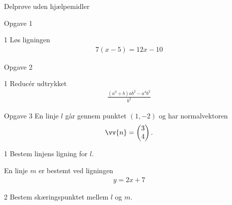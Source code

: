 \begin{center}
\LARGE
Delprøve uden hjælpemidler 
\end{center}
\begin{opgavetekst}{Opgave 1}
\end{opgavetekst}
	\begin{delopgave}{}{1}
		Løs ligningen 
		\begin{align*}
			7(x-5) = 12x-10
		\end{align*}
	\end{delopgave}
\begin{opgavetekst}{Opgave 2}
\end{opgavetekst}
	\begin{delopgave}{}{1}
		Reducér udtrykket 
		\begin{align*}
			 \frac{(a^3+b)ab^2-a^4b^2}{b^2}
		\end{align*}
	\end{delopgave}
\begin{opgavetekst}{Opgave 3}
	En linje $l$ går gennem punktet $(1,-2)$ og har normalvektoren
	\begin{align*}
		\vv{n} = 
		\begin{pmatrix}
			3 \\ 4
		\end{pmatrix}.
	\end{align*}	
\end{opgavetekst}
\begin{delopgave}{}{1}
	Bestem linjens ligning for $l$. 
\end{delopgave}
\begin{meretekst}
	En linje $m$ er bestemt ved ligningen
	\begin{align*}
		y = 2x+7
	\end{align*}
\end{meretekst}
\begin{delopgave}{}{2}
	Bestem skæringspunktet mellem $l$ og $m$.
\end{delopgave}
